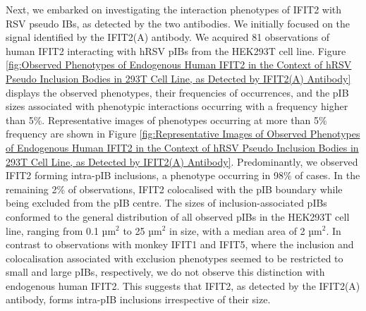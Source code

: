 Next, we embarked on investigating the interaction phenotypes of IFIT2 with RSV pseudo IBs, as detected by the two antibodies. We initially focused on the signal identified by the IFIT2(A) antibody. We acquired 81 observations of human IFIT2 interacting with hRSV pIBs from the HEK293T cell line. Figure \ref{fig:Observed Phenotypes of Endogenous Human IFIT2 in the Context of hRSV Pseudo Inclusion Bodies in 293T Cell Line, as Detected by IFIT2(A) Antibody} displays the observed phenotypes, their frequencies of occurrences, and the pIB sizes associated with phenotypic interactions occurring with a frequency higher than 5\%. Representative images of phenotypes occurring at more than 5\% frequency are shown in Figure \ref{fig:Representative Images of Observed Phenotypes of Endogenous Human IFIT2 in the Context of hRSV Pseudo Inclusion Bodies in 293T Cell Line, as Detected by IFIT2(A) Antibody}. Predominantly, we observed IFIT2 forming intra-pIB inclusions, a phenotype occurring in 98\% of cases. In the remaining 2\% of observations, IFIT2 colocalised with the pIB boundary while being excluded from the pIB centre. The sizes of inclusion-associated pIBs conformed to the general distribution of all observed pIBs in the HEK293T cell line, ranging from 0.1 \(\mbox{µm}^2\) to 25 \(\mbox{µm}^2\) in size, with a median area of 2 \(\mbox{µm}^2\). In contrast to observations with monkey IFIT1 and IFIT5, where the inclusion and colocalisation associated with exclusion phenotypes seemed to be restricted to small and large pIBs, respectively, we do not observe this distinction with endogenous human IFIT2. This suggests that IFIT2, as detected by the IFIT2(A) antibody, forms intra-pIB inclusions irrespective of their size.

